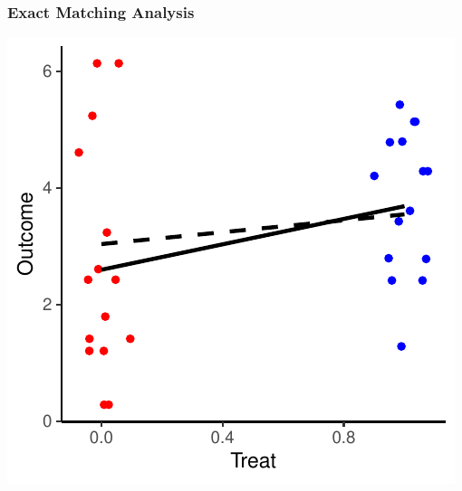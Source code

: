 \documentclass[xcolor=x11names,compress]{beamer}\usepackage[]{graphicx}\usepackage[]{color}
\makeatletter
\def\maxwidth{ %
  \ifdim\Gin@nat@width>\linewidth
    \linewidth
  \else
    \Gin@nat@width
  \fi
}
\newenvironment{knitrout}{}{} %
\renewcommand{\(}{\begin{columns}}
\renewcommand{\)}{\end{columns}}
\newcommand{\<}[1]{\begin{column}{#1}}
\renewcommand{\>}{\end{column}}
\makeatother
\begin{document}
\begin{frame}
\frametitle{Exact Matching Analysis}
\begin{center}
\begin{knitrout}
\color{fgcolor}
\includegraphics[width=\maxwidth]{figure/exact_matching_analysis4-1} 

\end{knitrout}
\end{center}
\end{frame}
\end{document}
